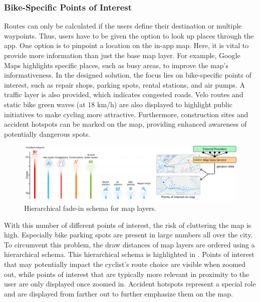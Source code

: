 \subsubsection{Bike-Specific Points of Interest}

Routes can only be calculated if the users define their destination or multiple waypoints. Thus, users have to be given the option to look up places through the app. One option is to pinpoint a location on the in-app map. Here, it is vital to provide more information than just the base map layer. For example, Google Maps highlights specific places, such as busy areas, to improve the map's informativeness. In the designed solution, the focus lies on bike-specific points of interest, such as repair shops, parking spots, rental stations, and air pumps. A traffic layer is also provided, which indicates congested roads. Velo routes and static bike green waves (at 18 km/h) are also displayed to highlight public initiatives to make cycling more attractive. Furthermore, construction sites and accident hotspots can be marked on the map, providing enhanced awareness of potentially dangerous spots.

\begin{figure}[htbp]
\centering
\includegraphics[width=\linewidth]{images/points-of-interest.png}
\caption{Hierarchical fade-in schema for map layers.}
\label{fig:points-of-interest}
\end{figure}

With this number of different points of interest, the risk of cluttering the map is high. Especially bike parking spots are present in large numbers all over the city. To circumvent this problem, the draw distances of map layers are ordered using a hierarchical schema. This hierarchical schema is highlighted in . Points of interest that may potentially impact the cyclist's route choice are visible when zoomed out, while points of interest that are typically more relevant in proximity to the user are only displayed once zoomed in. Accident hotspots represent a special role and are displayed from farther out to further emphasize them on the map.

